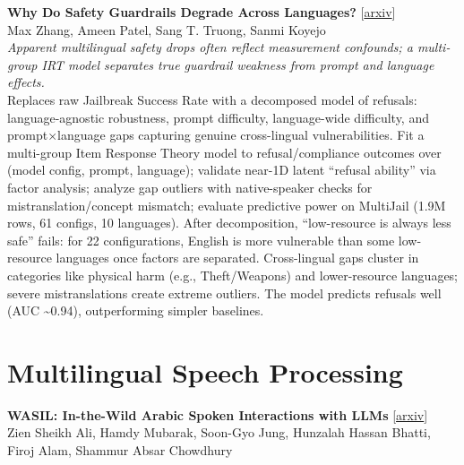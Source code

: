 \documentclass[12pt,letterpaper]{article}
\begin{document}
{\small\textbf{Why Do Safety Guardrails Degrade Across Languages?}} {\scriptsize[\href{https://arxiv.org/abs/2605.17173}{arxiv}]}\\
{\scriptsize Max Zhang, Ameen Patel, Sang T. Truong, Sanmi Koyejo}\\

{\small\textit{Apparent multilingual safety drops often reflect measurement confounds; a multi-group IRT model separates true guardrail weakness from prompt and language effects.}}\\[1pt]
{\footnotesize Replaces raw Jailbreak Success Rate with a decomposed model of refusals: language-agnostic robustness, prompt difficulty, language-wide difficulty, and prompt×language gaps capturing genuine cross-lingual vulnerabilities. Fit a multi-group Item Response Theory model to refusal/compliance outcomes over (model config, prompt, language); validate near-1D latent ``refusal ability'' via factor analysis; analyze gap outliers with native-speaker checks for mistranslation/concept mismatch; evaluate predictive power on MultiJail (1.9M rows, 61 configs, 10 languages). After decomposition, ``low-resource is always less safe'' fails: for 22 configurations, English is more vulnerable than some low-resource languages once factors are separated. Cross-lingual gaps cluster in categories like physical harm (e.g., Theft/Weapons) and lower-resource languages; severe mistranslations create extreme outliers. The model predicts refusals well (AUC \textasciitilde{}0.94), outperforming simpler baselines.}

\medskip


\section*{Multilingual Speech Processing}

{\small\textbf{WASIL: In-the-Wild Arabic Spoken Interactions with LLMs}} {\scriptsize[\href{https://arxiv.org/abs/2605.16364}{arxiv}]}\\
{\scriptsize Zien Sheikh Ali, Hamdy Mubarak, Soon-Gyo Jung, Hunzalah Hassan Bhatti, Firoj Alam, Shammur Absar Chowdhury}\\
\end{document}
